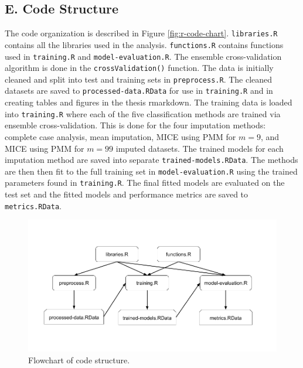 \documentclass[12pt,]{article}
\newcommand{\appendixE}{ \setcounter{table}{0} \renewcommand{\thetable}{E\arabic{table}} \setcounter{figure}{0} \renewcommand{\thefigure}{E\arabic{figure}} }
\begin{document}
\subsection*{E. Code Structure}\label{e.-code-structure}

\appendixE

The code organization is described in Figure \ref{fig:r-code-chart}.
\texttt{libraries.R} contains all the libraries used in the analysis.
\texttt{functions.R} contains functions used in \texttt{training.R} and
\texttt{model-evaluation.R}. The ensemble cross-validation algorithm is
done in the \texttt{crossValidation()} function. The data is initially
cleaned and split into test and training sets in \texttt{preprocess.R}.
The cleaned datasets are saved to \texttt{processed-data.RData} for use
in \texttt{training.R} and in creating tables and figures in the thesis
rmarkdown. The training data is loaded into \texttt{training.R} where
each of the five classification methods are trained via ensemble
cross-validation. This is done for the four imputation methods: complete
case analysis, mean imputation, MICE using PMM for \(m=9\), and MICE
using PMM for \(m=99\) imputed datasets. The trained models for each
imputation method are saved into separate \texttt{trained-models.RData}.
The methods are then then fit to the full training set in
\texttt{model-evaluation.R} using the trained parameters found in
\texttt{training.R}. The final fitted models are evaluated on the test
set and the fitted models and performance metrics are saved to
\texttt{metrics.RData}.

\begin{figure}[H]

{\centering \includegraphics[width=1\linewidth]{images/r-code-chart} 

}

\caption{\label{fig:r-code-chart}Flowchart of code structure.}\label{fig:unnamed-chunk-17}
\end{figure}
\end{document}
